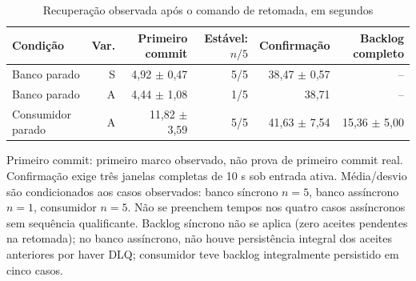 \begin{table}[htbp]
\centering
\caption{Recuperação observada após o comando de retomada, em segundos}
\label{tab:final-recuperacao}
\small
\setlength{\tabcolsep}{4pt}
\begin{tabular}{lrrrrr}
\hline
Condição & Var. & Primeiro commit & Estável: $n/5$ & Confirmação & Backlog completo \\ \hline
Banco parado & S & 4,92 $\pm$ 0,47 & 5/5 & 38,47 $\pm$ 0,57 & -- \\
Banco parado & A & 4,44 $\pm$ 1,08 & 1/5 & 38,71 & -- \\
Consumidor parado & A & 11,82 $\pm$ 3,59 & 5/5 & 41,63 $\pm$ 7,54 & 15,36 $\pm$ 5,00 \\
\hline
\end{tabular}
\vspace{0.2cm}
\begin{minipage}{\textwidth}
\footnotesize
Primeiro commit: primeiro marco observado, não prova de primeiro commit real. Confirmação exige três janelas completas de 10 s sob entrada ativa. Média/desvio são condicionados aos casos observados: banco síncrono $n=5$, banco assíncrono $n=1$, consumidor $n=5$. Não se preenchem tempos nos quatro casos assíncronos sem sequência qualificante. Backlog síncrono não se aplica (zero aceites pendentes na retomada); no banco assíncrono, não houve persistência integral dos aceites anteriores por haver DLQ; consumidor teve backlog integralmente persistido em cinco casos.
\end{minipage}
\end{table}
